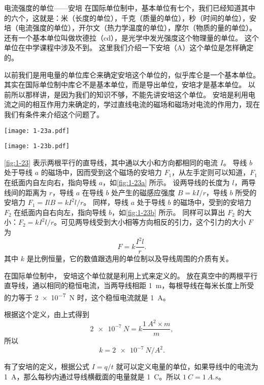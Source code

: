 \begin{Reading}{电流强度的单位——安培}
在国际单位制中，基本单位有七个，我们已经知道其中的六个，这就是：米（长度的单位），千克（质量的单位），秒（时间的单位），安培（电流强度的单位），开尔文（热力学温度的单位），摩尔（物质的量的单位）。
还有一个基本单位叫做坎德拉（\unit{cd}），是光学中发光强度这个物理量的单位。
这个单位在中学课程中涉及不到。
这里我们介绍一下安培（\unit{A}）这个单位是怎样确定的。

以前我们是用电量的单位库仑来确定安培这个单位的，似乎库仑是一个基本单位。
其实在国际单位制中库仑不是基本单位，而是导出单位，安培才是基本单位。
以前所以那样讲，是因为我们的知识不够，不能先讲安培这个单位。
安培是利用电流之间的相互作用力来确定的，学过直线电流的磁场和磁场对电流的作用力，现在我们有条件来介绍这个问题了。
\begin{figurehere}
  \nextfloat
  \begin{minipage}[b]{0.48\linewidth}\centering
    \texttt{[image: 1-23a.pdf]}
    \subcaption{}\label{fig:1-23a}
  \end{minipage}
  \begin{minipage}[b]{0.48\linewidth}\centering
    \texttt{[image: 1-23b.pdf]}
    \subcaption{}\label{fig:1-23b}
  \end{minipage}
  \caption{}\label{fig:1-23}
\end{figurehere}

\cref{fig:1-23} 表示两根平行的直导线，其中通以大小和方向都相同的电流 $I$。
导线 $b$ 处于导线 $a$ 的磁场中，因而受到这个磁场的安培力 $F_1$，从左手定则可以知道，$F_1$ 在纸面内自左向右，指向导线 $a$，如\cref{fig:1-23a} 所示。
设两导线的长度为 $l$，两导线间的距离为 $r$，导线 $a$ 在导线 $b$ 处产生的磁感应强度 $B=kI/r$，导线 $b$ 所受的安培力 $F_1=Il B=kI^2l/r$。
同样，导线 $a$ 处于导线 $b$ 的磁场中，受到的安培力 $F_2$ 在纸面内自右向左，指向导线 $b$，如\cref{fig:1-23b} 所示。
同样可以算出 $F_2$ 的大小：$F_2=kI^2l/r$。可见两导线受到大小相等方向相反的引力，这个引力的大小 $F$ 为
\[F=k\frac{I^2l}{r}.\]
其中 $k$ 是比例恒量，它的数值跟选用的单位制以及导线周围的介质有关。

在国际单位制中， 安培这个单位就是利用上式来定义的。
放在真空中的两根平行直导线，通以相同的稳恒电流，当两导线相距 \qty{1}{m}，每根导线在每米长度上所受的力等于 \qty{2e-7}{N} 时，这个稳恒电流就是 \qty{1}{A}。

根据这个定义，由上式得到
\[ \qty{2e-7}{N}=k\frac{\qty{1}{A^2}\times \unit{m}}{\unit{m}},\]
所以
\[k=\qty{2e-7}{N/A^2}.\]

有了安培的定义，根据公式 $I=q/t$ 就可以定义电量的单位，如果导线中的电流为 \qty{1}{A}，那么每秒内通过导线横截面的电量就是 \qty{1}{C}。所以 $\qty{1}{C}=\qty{1}{A.s}$。
\end{Reading}

